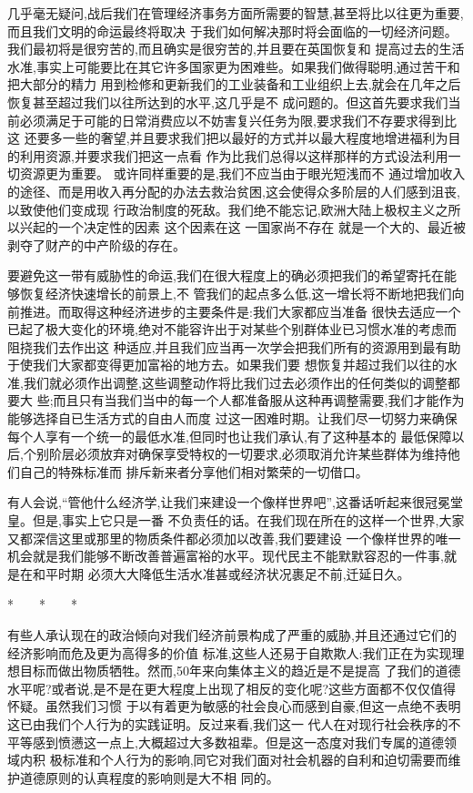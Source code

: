 ﻿\documentclass[12pt]{article}
\begin{document}
几乎毫无疑问,战后我们在管理经济事务方面所需要的智慧,甚至将比以往更为重要,而且我们文明的命运最终将取决
于我们如何解决那时将会面临的一切经济问题。我们最初将是很穷苦的,而且确实是很穷苦的,并且要在英国恢复和
提高过去的生活水准,事实上可能要比在其它许多国家更为困难些。如果我们做得聪明,通过苦干和把大部分的精力
用到检修和更新我们的工业装备和工业组织上去,就会在几年之后恢复甚至超过我们以往所达到的水平,这几乎是不
成问题的。但这首先要求我们当前必须满足于可能的日常消费应以不妨害复兴任务为限,要求我们不存要求得到比这
还要多一些的奢望,并且要求我们把以最好的方式并以最大程度地增进福利为目的利用资源,并要求我们把这一点看
作为比我们总得以这样那样的方式设法利用一切资源更为重要。 或许同样重要的是,我们不应当由于眼光短浅而不
通过增加收入的途径、而是用收入再分配的办法去救治贫困,这会使得众多阶层的人们感到沮丧,以致使他们变成现
行政治制度的死敌。我们绝不能忘记,欧洲大陆上极权主义之所以兴起的一个决定性的因素 \myrule 这个因素在这
一国家尚不存在 \myrule 就是一个大的、最近被剥夺了财产的中产阶级的存在。

要避免这一带有威胁性的命运,我们在很大程度上的确必须把我们的希望寄托在能够恢复经济快速增长的前景上,不
管我们的起点多么低,这一增长将不断地把我们向前推进。而取得这种经济进步的主要条件是:我们大家都应当准备
很快去适应一个已起了极大变化的环境,绝对不能容许出于对某些个别群体业已习惯水准的考虑而阻挠我们去作出这
种适应,并且我们应当再一次学会把我们所有的资源用到最有助于使我们大家都变得更加富裕的地方去。如果我们要
想恢复并超过我们以往的水准,我们就必须作出调整,这些调整动作将比我们过去必须作出的任何类似的调整都要大
些;而且只有当我们当中的每一个人都准备服从这种再调整需要,我们才能作为能够选择自已生活方式的自由人而度
过这一困难时期。让我们尽一切努力来确保每个人享有一个统一的最低水准,但同时也让我们承认,有了这种基本的
最低保障以后,个别阶层必须放弃对确保享受特权的一切要求,必须取消允许某些群体为维持他们自己的特殊标准而
排斥新来者分享他们相对繁荣的一切借口。

有人会说,``管他什么经济学,让我们来建设一个像样世界吧'',这番话听起来很冠冕堂皇。但是,事实上它只是一番
不负责任的话。在我们现在所在的这样一个世界,大家又都深信这里或那里的物质条件都必须加以改善,我们要建设
一个像样世界的唯一机会就是我们能够不断改善普遍富裕的水平。现代民主不能默默容忍的一件事,就是在和平时期
必须大大降低生活水准甚或经济状况裹足不前,迁延日久。

*　　*　　*

有些人承认现在的政治倾向对我们经济前景构成了严重的威胁,并且还通过它们的经济影响而危及更为高得多的价值
标准,这些人还易于自欺欺人:我们正在为实现理想目标而做出物质牺牲。然而,50年来向集体主义的趋近是不是提高
了我们的道德水平呢?或者说,是不是在更大程度上出现了相反的变化呢?这些方面都不仅仅值得怀疑。虽然我们习惯
于以有着更为敏感的社会良心而感到自豪,但这一点绝不表明这已由我们个人行为的实践证明。反过来看,我们这一
代人在对现行社会秩序的不平等感到愤懑这一点上,大概超过大多数祖辈。但是这一态度对我们专属的道德领域内积
极标准和个人行为的影响,同它对我们面对社会机器的自利和迫切需要而维护道德原则的认真程度的影响则是大不相
同的。
\end{document}
